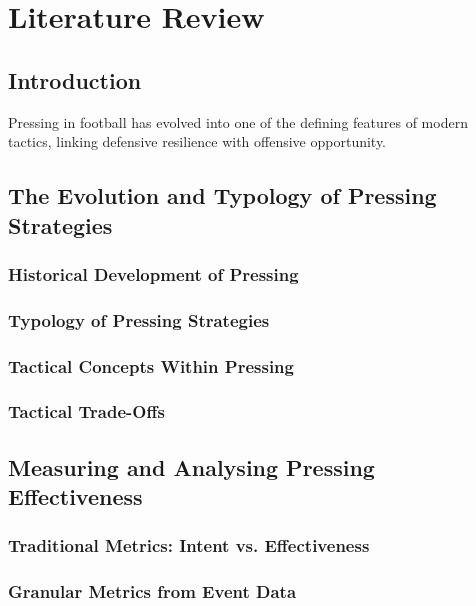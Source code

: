 \chapter{Literature Review}
\section{Introduction}
Pressing in football has evolved into one of the defining features of modern tactics, linking defensive resilience with offensive opportunity. 

\section{The Evolution and Typology of Pressing Strategies}

\subsection{Historical Development of Pressing}



\subsection{Typology of Pressing Strategies}



\subsection{Tactical Concepts Within Pressing}



\subsection{Tactical Trade-Offs}

\section{Measuring and Analysing Pressing Effectiveness}

\subsection{Traditional Metrics: Intent vs. Effectiveness}


\subsection{Granular Metrics from Event Data}


